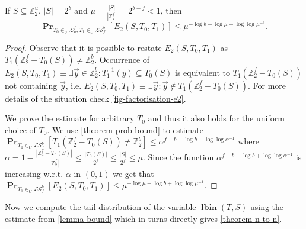 \documentclass[unicode,review]{siamart1116}
\newcommand{\lbin}[2]{\operatorname{\mathbf{lbin}}({#1}, {#2})}
\newcommand{\vecspace}[2]{\mathbb{Z}_{#1}^{#2}}
\newcommand{\binvecspace}[1]{\vecspace{2}{#1}}
\newcommand{\linearmaps}[2]{\mathcal{L}_{#1}^{#2}}
\newcommand{\surjectivelinearmaps}[2]{\mathcal{LS}_{#1}^{#2}}
\newcommand{\probs}[2]{\operatorname{\mathbf{Pr}}_{{#1}}\left[{#2}\right]}
\numberwithin{theorem}{section}
\begin{document}
\begin{lemma}
\label{lemma-bound}
If $S \subseteq \binvecspace{u}$, $|S| = 2^b$ and $\mu = \frac{|S|}{|\binvecspace{f}|} = 2^{b - f} < 1$, then
\[
\probs{T_0 \in_U \linearmaps{u}{f}, T_1 \in_U \surjectivelinearmaps{f}{b}}{E_2(S, T_0, T_1)} \leq \mu ^ {-\log b - \log \mu + \log \log \mu^{-1}}.
\]
\end{lemma}
\begin{proof}
Observe that it is possible to restate $E_2(S, T_0, T_1)$ as $T_1(\binvecspace{f} - T_0(S)) \neq \binvecspace{b}$. 
Occurrence of $E_2(S, T_0, T_1) \equiv \exists \vec{y} \in \binvecspace{b} \colon T_1^{-1}(y) \subseteq T_0(S)$ is equivalent to $T_1(\binvecspace{f} - T_0(S))$ not containing $\vec{y}$, i.e. $E_2(S, T_0, T_1) \equiv \exists \vec{y} \colon \vec{y} \not\in T_1(\binvecspace{f} - T_0(S))$.
For more details of the situation check \cref{fig-factorisation-e2}.

We prove the estimate for arbitrary $T_0$ and thus it also holds for the uniform choice of $T_0$. 
We use \cref{theorem-prob-bound} to estimate $\probs{T_1\in_U \surjectivelinearmaps{f}{b}}{T_1(\binvecspace{f} - T_0(S)) \neq \binvecspace{b}} \leq \alpha ^ {f - b - \log b + \log \log \alpha^{-1}}$ where $\alpha = 1 - \frac{|\binvecspace{f} - T_0(S)|}{|\binvecspace{f}|} \leq \frac{|T_0(S)|}{2^f} \leq \frac{|S|}{2^f} \leq \mu$.
Since the function $\alpha ^ {f - b - \log b + \log \log \alpha^{-1}}$ is increasing w.r.t. $\alpha$ in $(0, 1)$ we get that
$
\probs{T_1 \in_U \surjectivelinearmaps{f}{b}}{E_2(S, T_0, T_1)} \leq \mu ^ {-\log \mu - \log b + \log \log \mu^{-1}}.
$
\end{proof} 

Now we compute the tail distribution of the variable $\lbin{T}{S}$ using the estimate from \cref{lemma-bound} which in turns directly gives \cref{theorem-n-to-n}.
\end{document}
